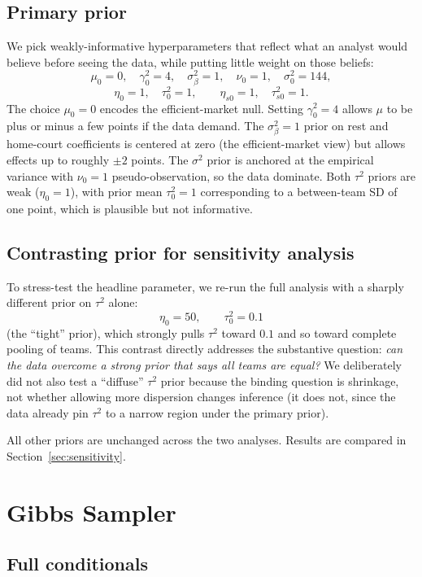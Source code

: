 \documentclass[11pt]{article}
\begin{document}
\subsection{Primary prior}

We pick weakly-informative hyperparameters that reflect what an analyst
would believe before seeing the data, while putting little weight on those
beliefs:
\[
\mu_0 = 0,\quad \gamma_0^2 = 4,\quad \sigma_\beta^2 = 1,\quad
\nu_0 = 1,\quad \sigma_0^2 = 144,
\]
\[
\eta_0 = 1,\quad \tau_0^2 = 1,\qquad \eta_{s0} = 1,\quad \tau_{s0}^2 = 1.
\]
The choice $\mu_0 = 0$ encodes the efficient-market null. Setting
$\gamma_0^2 = 4$ allows $\mu$ to be plus or minus a few points if the
data demand. The $\sigma_\beta^2 = 1$ prior on rest and home-court
coefficients is centered at zero (the efficient-market view) but allows
effects up to roughly $\pm 2$ points. The $\sigma^2$ prior is anchored at
the empirical variance with $\nu_0 = 1$ pseudo-observation, so the data
dominate. Both $\tau^2$ priors are weak ($\eta_0 = 1$), with prior mean
$\tau_0^2 = 1$ corresponding to a between-team SD of one point, which is plausible
but not informative.

\subsection{Contrasting prior for sensitivity analysis}

To stress-test the headline parameter, we re-run the full analysis with a
sharply different prior on $\tau^2$ alone:
\[
\eta_0 = 50,\qquad \tau_0^2 = 0.1
\]
(the ``tight'' prior), which strongly pulls $\tau^2$ toward $0.1$ and so
toward complete pooling of teams. This contrast directly addresses the
substantive question: \emph{can the data overcome a strong prior that says
all teams are equal?} We deliberately did not also test a ``diffuse''
$\tau^2$ prior because the binding question is shrinkage, not whether
allowing more dispersion changes inference (it does not, since the data
already pin $\tau^2$ to a narrow region under the primary prior).

All other priors are unchanged across the two analyses. Results are
compared in Section~\ref{sec:sensitivity}.

\section{Gibbs Sampler}

\subsection{Full conditionals}
\end{document}
